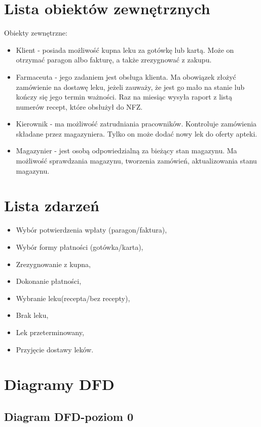 \documentclass[a4paper, 11pt]{article}
\begin{document}
	\section{Lista obiektów zewnętrznych}
	Obiekty zewnętrzne:
	\begin{itemize}
	\item Klient - posiada możliwość kupna leku za gotówkę lub kartą. Może on otrzymać paragon albo fakturę, a także zrezygnować z zakupu.
	\item Farmaceuta - jego zadaniem jest obsługa klienta. Ma obowiązek złożyć zamówienie na dostawę leku, jeżeli zauważy, że jest go mało na stanie lub kończy się jego termin ważności. Raz na miesiąc wysyła raport z listą numerów recept, które obsłużył do NFZ.
	\item Kierownik - ma możliwość zatrudniania pracowników. Kontroluje zamówienia składane przez magazyniera. Tylko on może dodać nowy lek do oferty apteki.
	\item Magazynier - jest osobą odpowiedzialną za bieżący stan magazynu. Ma możliwość sprawdzania magazynu, tworzenia zamówień, aktualizowania stanu magazynu.
	\end{itemize}
	\section{Lista zdarzeń}
	
	\begin{itemize}
	\item Wybór potwierdzenia wpłaty (paragon/faktura),
	\item Wybór formy płatności (gotówka/karta),
	\item Zrezygnowanie z kupna,
	\item Dokonanie płatności,
	\item Wybranie leku(recepta/bez recepty),
	\item Brak leku,
	\item Lek przeterminowany,
	\item Przyjęcie dostawy leków.
	\end{itemize}
	

	\section{Diagramy DFD}
	\subsection{Diagram DFD-poziom 0}
	
\end{document}
